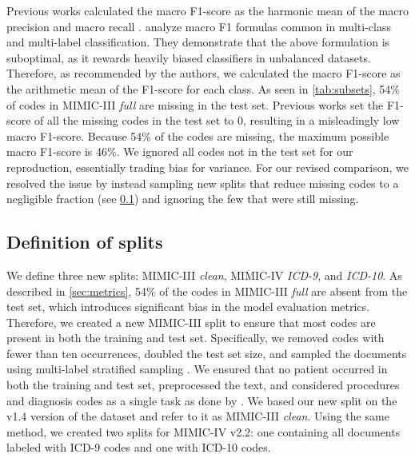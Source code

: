 {Previous works calculated the macro F1-score as the harmonic mean of the macro precision and macro recall \parencite{mullenbachExplainablePredictionMedical2018, liICDCodingClinical2020, vuLabelAttentionModel2020, huangPLMICDAutomaticICD2022}. \textcite{opitzMacroF1Macro2021} analyze macro F1 formulas common in multi-class and multi-label classification. They demonstrate that the above formulation is suboptimal, as it rewards heavily biased classifiers in unbalanced datasets. Therefore, as recommended by the authors, we calculated the macro F1-score as the arithmetic mean of the F1-score for each class.
As seen in \cref{tab:subsets}, 54\% of codes in MIMIC-III \textit{full} are missing in the test set. Previous works set the F1-score of all the missing codes in the test set to 0, resulting in a misleadingly low macro F1-score. Because 54\% of the codes are missing, the maximum possible macro F1-score is 46\%. 
We ignored all codes not in the test set for our reproduction, essentially trading bias for variance. 
For our revised comparison, we resolved the issue by instead sampling new splits that reduce missing codes to a negligible fraction (see \cref{sec: splits}) and ignoring the few that were still missing.


\subsection{Definition of splits}
\label{sec: splits}


We define three new splits: MIMIC-III \textit{clean}, MIMIC-IV \textit{ICD-9}, and \textit{ICD-10}.
As described in \cref{sec:metrics}, 54\% of the codes in MIMIC-III \textit{full} are absent from the test set, which introduces significant bias in the model evaluation metrics. Therefore, we created a new MIMIC-III split to ensure that most codes are present in both the training and test set. 
Specifically, we removed codes with fewer than ten occurrences, doubled the test set size, and sampled the documents using multi-label stratified sampling \parencite{sechidisStratificationMultilabelData2011}. 
We ensured that no patient occurred in both the training and test set, preprocessed the text, and considered procedures and diagnosis codes as a single task as done by \textcite{mullenbachExplainablePredictionMedical2018}.
We based our new split on the v1.4 version of the dataset and refer to it as MIMIC-III \textit{clean}.
Using the same method, we created two splits for MIMIC-IV v2.2: one containing all documents labeled with ICD-9 codes and one with ICD-10 codes.


}
